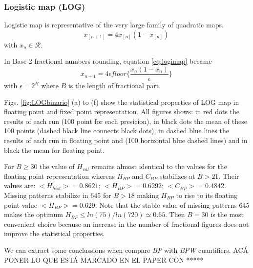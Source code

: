 \subsubsection{Logistic map (LOG)} \label{subsubsec:log}

Logistic map is representative of the very large family of quadratic maps. 
\begin{equation}\label{eq:logimap}
 x_{[n+1]}=4x_{[n]}(1-x_{[n]}) \,
\end{equation}
with $x_n\in\mathcal{R}$.

In Base-2 fractional numbers rounding, equation \ref{eq:logimap} became
\begin{equation}\label{eq:logimapB2}
x_{n+1}=4 \epsilon floor\{\frac{x_n(1-x_n)}{\epsilon}\} \,
\end{equation}
with $\epsilon = 2^B$ where $B$ is the length of fractional part.

Figs. \ref{fig:LOGbinario} (a) to (f) show the statistical properties of LOG map in floating point and fixed point representation.
All figures shows: in red dots the results of each run (100 point for each presicion), in black dots the mean of these 100 points (dashed black line connects black dots), in dashed blue lines the results of each run in floating point and (100 horizontal blue dashed lines) and in black the mean for floating point.

For $B\geq 30$ the value of $H_{val}$ remains almost identical to the values for the floating point representation whereas $H_{BP}$ and $C_{BP}$ stabilizes at $B>21$.
Their values are: $<H_{hist}>=0.8621$; $<H_{BP}>=0.6292$; $<C_{BP}>=0.4842$.
Missing patterns stabilize in $645$ for $B > 18$ making $H_{BP}$ to rise to its floating point value $<H_{BP}>=0.629$.
Note that the stable value of missing patterns $645$ makes the optimum $H_{BP} \leq ln(75)/ln(720) \simeq 0.65$. Then $B=30$ is the most convenient choice because an increase in the number of fractional figures does not improve the statistical properties.

We can extract some conclussions when compare \textit{BP} with \textit{BPW} cuantifiers. ACÁ PONER LO QUE ESTÁ MARCADO EN EL PAPER CON *****

